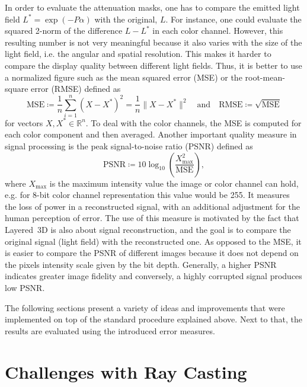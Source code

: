 In order to evaluate the attenuation masks, one has to compare the emitted light field $L^\ast = \exp(- P \alpha)$ with the original, $L$.
For instance, one could evaluate the squared 2-norm of the difference $L - L^\ast$ in each color channel.
However, this resulting number is not very meaningful because it also varies with the size of the light field, i.e. the angular and spatial resolution.
This makes it harder to compare the display quality between different light fields.
Thus, it is better to use a normalized figure such as the mean squared error \mbox{(MSE)} or the root-mean-square error \mbox{(RMSE)} defined as
\begin{equation*}
	\text{MSE} \coloneqq \frac{1}{n} \sum_{i = 1}^{n} (X - X^\ast)^2 = \frac{1}{n} \lVert X - X^\ast \rVert^2
	\quad \text{and} \quad
	\text{RMSE} \coloneqq \sqrt{\text{MSE}}
\end{equation*}
for vectors $X, X^\ast \in \mathbb{R}^n$.
To deal with the color channels, the \mbox{MSE} is computed for each color component and then averaged.
Another important quality measure in signal processing is the peak signal-to-noise ratio \mbox{(PSNR)} defined as
\begin{equation*}
	\text{PSNR} \coloneqq 10 \log_{10} \left(\frac{X_\text{max}^2}{\text{MSE}}\right),
\end{equation*}
where $X_\text{max}$ is the maximum intensity value the image or color channel can hold, e.g. for 8-bit color channel representation this value would be 255.
It measures the loss of power in a reconstructed signal, with an additional adjustment for the human perception of error.
The use of this measure is motivated by the fact that \mbox{Layered 3D} is also about signal reconstruction, and the goal is to compare the original signal (light field) with the reconstructed one. 
As opposed to the MSE, it is easier to compare the PSNR of different images because it does not depend on the pixels intensity scale given by the bit depth.
Generally, a higher \mbox{PSNR} indicates greater image fidelity and conversely, a highly corrupted signal produces low \mbox{PSNR}.

The following sections present a variety of ideas and improvements that were implemented on top of the standard procedure explained above.
Next to that, the results are evaluated using the introduced error measures.

\section{Challenges with Ray Casting}
\label{sec:challenges_ray_casting}

